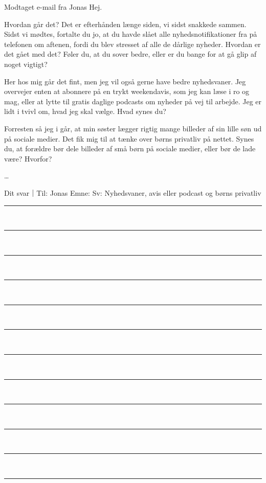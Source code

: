 \begin{emailbox}{Modtaget e-mail fra Jonas}
Hej.

\vspace{0.3em}
Hvordan går det? Det er efterhånden længe siden, vi sidst snakkede sammen. Sidst vi mødtes, fortalte du jo, at du havde slået alle nyhedsnotifikationer fra på telefonen om aftenen, fordi du blev stresset af alle de dårlige nyheder. Hvordan er det gået med det? Føler du, at du sover bedre, eller er du bange for at gå glip af noget vigtigt?

\vspace{0.3em}
Her hos mig går det fint, men jeg vil også gerne have bedre nyhedsvaner. Jeg overvejer enten at abonnere på en trykt weekendavis, som jeg kan læse i ro og mag, eller at lytte til gratis daglige podcasts om nyheder på vej til arbejde. Jeg er lidt i tvivl om, hvad jeg skal vælge. Hvad synes du?

\vspace{0.3em}
Forresten så jeg i går, at min søster lægger rigtig mange billeder af sin lille søn ud på sociale medier. Det fik mig til at tænke over børns privatliv på nettet. Synes du, at forældre bør dele billeder af små børn på sociale medier, eller bør de lade være? Hvorfor?

\vspace{0.3em}
\ldots
\end{emailbox}

\begin{emailbox}{Dit svar｜Til: Jonas \qquad Emne: Sv: Nyhedsvaner, avis eller podcast og børns privatliv}
\vspace{0.3em}
\rule{\linewidth}{0.4pt}\\[0.55em]
\rule{\linewidth}{0.4pt}\\[0.55em]
\rule{\linewidth}{0.4pt}\\[0.55em]
\rule{\linewidth}{0.4pt}\\[0.55em]
\rule{\linewidth}{0.4pt}\\[0.55em]
\rule{\linewidth}{0.4pt}\\[0.55em]
\rule{\linewidth}{0.4pt}\\[0.55em]
\rule{\linewidth}{0.4pt}\\[0.55em]
\rule{\linewidth}{0.4pt}\\[0.55em]
\rule{\linewidth}{0.4pt}\\[0.55em]
\rule{\linewidth}{0.4pt}\\[0.55em]
\rule{\linewidth}{0.4pt}
\end{emailbox}

